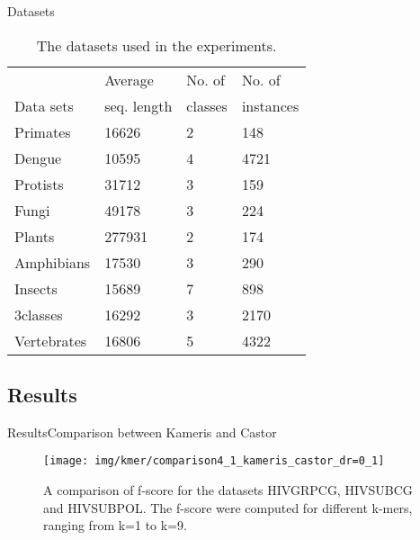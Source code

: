 \documentclass[10pt]{beamer}
\newcommand{\1}{
        	\setbeamertemplate{background}{
        		\texttt{[image: img/1]}
        		\tikz[overlay] \fill[fill opacity=0.75,fill=white] (0,0) rectangle (-\paperwidth,\paperheight);
        	}
}
\begin{document}
\begin{frame}{Datasets}
	\begin{table}[h]
		\centering
		\caption{The datasets used in the experiments.}
		\label{tab:datasets}
		\begin{tabular}{llll}
			\hline
			& Average  &   No. of & No. of    \\
			Data sets		& seq. length & classes &   instances \\
			\hline	
			Primates    & 16626  & 2  & 148     \\
			Dengue      & 10595  & 4  & 4721    \\
			Protists    & 31712  & 3  & 159     \\
			Fungi       & 49178  & 3  & 224     \\
			Plants      & 277931 & 2  & 174     \\
			Amphibians  & 17530  & 3  & 290    \\
			Insects     & 15689  & 7  & 898     \\
			3classes    & 16292  & 3  & 2170    \\
			Vertebrates & 16806  & 5  & 4322    \\
			\hline
		\end{tabular}
		
		\label{tab:datasets}
	\end{table}
	
\end{frame}


\subsection{Results}

\begin{frame}{Results}{Comparison between Kameris and Castor}
	\begin{figure}[h]
		\centering
		\texttt{[image: img/kmer/comparison4\_1\_kameris\_castor\_dr=0\_1]}
		\caption{A comparison of f-score for the datasets HIVGRPCG, HIVSUBCG and HIVSUBPOL. The f-score were computed for different k-mers, ranging from k=1 to k=9. }
		\label{fig:comparison2}
	\end{figure}
	
\end{frame}
\end{document}
